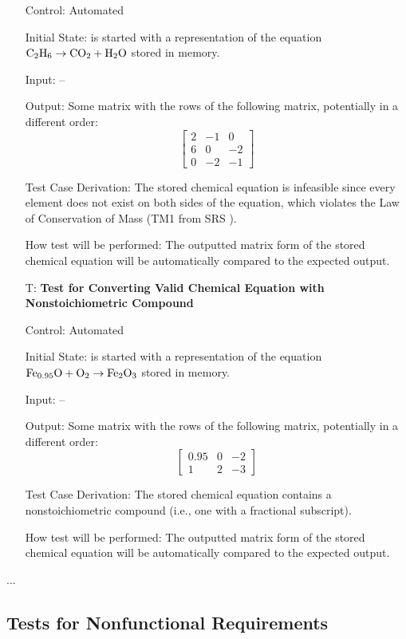 \documentclass[12pt, titlepage]{article}
\newcounter{testnum} %
\begin{document}
\begin{enumerate}
    Control: Automated

    Initial State: \progname{} is started with a representation of the equation
    $\ce{C2H6} \rightarrow \ce{CO2} + \ce{H2O}$ stored in memory.

    Input: --

    Output: Some matrix with the rows of the following matrix, potentially in a
    different order:
    $$\begin{bmatrix}
        2 & -1 & 0  \\
        6 & 0  & -2 \\
        0 & -2 & -1
      \end{bmatrix}$$

    Test Case Derivation: The stored chemical equation is infeasible since
    every element does not exist on both sides of the equation, which violates
    the Law of Conservation of Mass (TM1 from SRS ).

    How test will be performed: The outputted matrix form of the stored
    chemical equation will be automatically compared to the expected output.

  \item[T\refstepcounter{testnum}\thetestnum \label{test_convert_nonstoich_valid}:]
    \textbf{Test for Converting Valid Chemical Equation with Nonstoichiometric
      Compound}

    Control: Automated

    Initial State: \progname{} is started with a representation of the equation
    $\ce{Fe_{0.95}O} + \ce{O2} \rightarrow \ce{Fe2O3}$
    \cite{doubtnut_when_nodate} stored in memory.

    Input: --

    Output: Some matrix with the rows of the following matrix, potentially in a
    different order:
    $$\begin{bmatrix}
        0.95 & 0 & -2 \\
        1    & 2 & -3
      \end{bmatrix}$$

    Test Case Derivation: The stored chemical equation contains a
    nonstoichiometric compound (i.e., one with a fractional subscript).

    How test will be performed: The outputted matrix form of the stored
    chemical equation will be automatically compared to the expected output.

\end{enumerate}...

\subsection{Tests for Nonfunctional Requirements}
\end{document}
